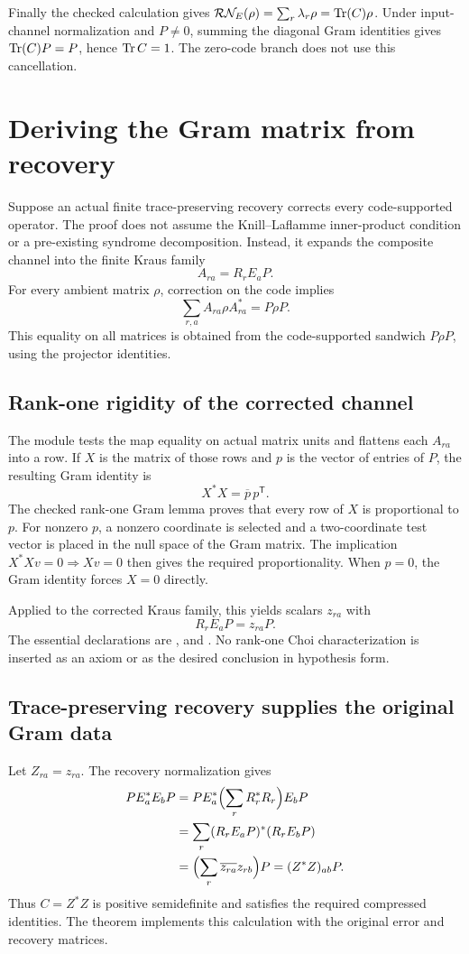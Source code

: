 Finally the checked calculation gives $\mathcal R\mathcal N_E(\rho)=\sum_r\lambda_r\rho=\Tr(C)\rho$. Under input-channel normalization and $P\ne0$, summing the diagonal Gram identities gives $\operatorname{Tr}(C)P=P$, hence $\operatorname{Tr} C=1$. The zero-code branch does not use this cancellation.



\section{Deriving the Gram matrix from recovery}\label{supp5:section:003}
Suppose an actual finite trace-preserving recovery corrects every code-supported operator. The proof does not assume the Knill--Laflamme inner-product condition or a pre-existing syndrome decomposition. Instead, it expands the composite channel into the finite Kraus family
\[
A_{ra}=R_rE_aP.
\]
For every ambient matrix $\rho$, correction on the code implies
\[
\sum_{r,a} A_{ra}\rho A_{ra}^*=P\rho P.
\]
This equality on all matrices is obtained from the code-supported sandwich $P\rho P$, using the projector identities.

\subsection{Rank-one rigidity of the corrected channel}
The module tests the map equality on actual matrix units and flattens each $A_{ra}$ into a row. If $X$ is the matrix of those rows and $p$ is the vector of entries of $P$, the resulting Gram identity is
\[
X^*X=\overline p\,p^{\mathsf T}.
\]
The checked rank-one Gram lemma proves that every row of $X$ is proportional to $p$. For nonzero $p$, a nonzero coordinate is selected and a two-coordinate test vector is placed in the null space of the Gram matrix. The implication $X^*Xv=0\Rightarrow Xv=0$ then gives the required proportionality. When $p=0$, the Gram identity forces $X=0$ directly.

Applied to the corrected Kraus family, this yields scalars $z_{ra}$ with
\[
R_rE_aP=z_{ra}P.
\]
The essential declarations are ,  and . No rank-one Choi characterization is inserted as an axiom or as the desired conclusion in hypothesis form.

\subsection{Trace-preserving recovery supplies the original Gram data}
Let $Z_{ra}=z_{ra}$. The recovery normalization gives
\begin{align*}
PE_a^*E_bP
&=PE_a^*\Bigl(\sum_rR_r^*R_r\Bigr)E_bP\\
&=\sum_r(R_rE_aP)^*(R_rE_bP)\\
&=\Bigl(\sum_r\overline{z_{ra}}z_{rb}\Bigr)P
=(Z^*Z)_{ab}P.
\end{align*}
Thus $C=Z^*Z$ is positive semidefinite and satisfies the required compressed identities. The theorem  implements this calculation with the original error and recovery matrices.

